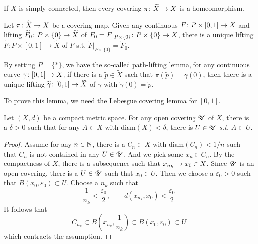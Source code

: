 \begin{enumerate}[label=\arabic{*}.]
	\begin{cor}
		If $X$ is simply connected, then every covering $\pi \colon \widetilde{X} \rightarrow X$ is a homeomorphism.
	\end{cor}

	\begin{lem}\label{lem:homolift}
		Let $\pi \colon \widetilde{X} \rightarrow X$ be a covering map. Given any continuous $F \colon P \times [0,1] \rightarrow X$ and lifting $\widetilde{F}_0 \colon P \times \left\{0\right\} \rightarrow \widetilde{X}$ of $F_0 = F|_{P \times \left\{0\right\}} \colon P \times \left\{0\right\} \rightarrow X$, there is a unique lifting $\widetilde{F}: P \times [0,1] \rightarrow \widetilde{X}$ of $F$ s.t. $\widetilde{F}|_{P \times\{0\}}=\widetilde{F}_0$.
	\end{lem}
	\begin{rmk}
		By setting $P=\{*\}$, we have the so-called path-lifting lemma, for any continuous curve $\gamma \colon [0,1] \rightarrow X$, if there is a $\widetilde{p} \in \widetilde{X}$ such that $\pi(\widetilde{p}) = \gamma(0)$, then there is a unique lifting $\widetilde{\gamma} \colon [0,1] \rightarrow \widetilde{X}$ of $\gamma$ with $\tilde{\gamma}(0) = \widetilde{p}$.
	\end{rmk}
	To prove this lemma, we need the Lebesgue covering lemma for $[0,1]$.
	\begin{lem}
		Let $(X,d)$ be a compact metric space. For any open covering $\mathscr{U}$ of $X$, there is a $\delta > 0$ such that for any $A \subset X$ with $\text{diam}(X) < \delta$, there is $U \in \mathscr{U}$ \emph{s.t.} $A \subset U$.
	\end{lem}
	\begin{proof}
		Assume for any $n \in \mathbb{N}$, there is a $C_n \subset X$ with $\text{diam}(C_n) < 1/n$ such that $C_n$ is not contained in any $U \in \mathscr{U}$. And we pick some $x_n \in C_n$. By the compactness of $X$, there is a subsequence such that $x_{n_k} \rightarrow x_0 \in X$. Since $\mathscr{U}$ is an open covering, there is a $U \in \mathscr{U}$ such that $x_0 \in U$. Then we choose a $\varepsilon_0 > 0$ such that $B(x_0,\varepsilon_0) \subset U$. Choose a $n_k$ such that
		\begin{equation*}
			\frac{1}{n_k}<\frac{\varepsilon_0}{2}, \quad \quad d\left(x_{n_k}, x_0\right)<\frac{\varepsilon_0}{2}
		\end{equation*}
		It follows that
		\begin{equation*}
			C_{n_k} \subset B\left(x_{n_k}, \frac{1}{n_k}\right) \subset B\left(x_0, \varepsilon_0\right) \subset U
		\end{equation*}
		which contracts the assumption.
	\end{proof}


\end{enumerate}
